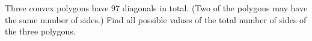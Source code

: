Three convex polygons have $97$ diagonals in total. (Two of the polygons may have the same number of sides.) Find all possible values of the total number of sides of the three polygons.
